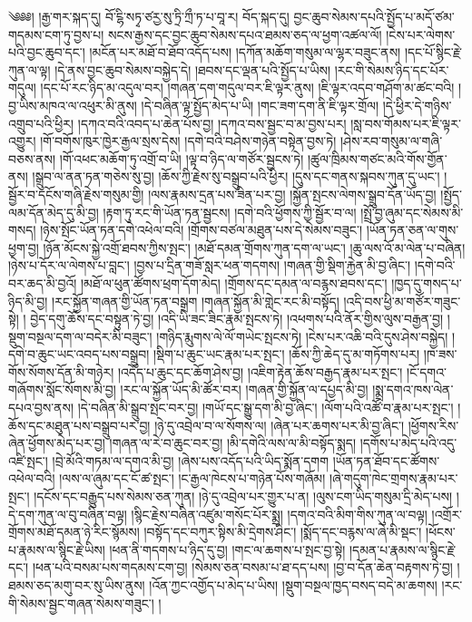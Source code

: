༄༅༅། །རྒྱ་གར་སྐད་དུ། བོ་ངྷི་སཏྭ་ཙརྱ་སུ་ཏྲི་ཀྲྀ་ཏ་པ་བཱ་ར། བོད་སྐད་དུ། བྱང་ཆུབ་སེམས་དཔའི་སྤྱོད་པ་མདོ་ཙམ་གདམས་ངག་ཏུ་བྱས་པ། སངས་རྒྱས་དང་བྱང་ཆུབ་སེམས་དཔའ་ཐམས་ཅད་ལ་ཕྱག་འཚལ་ལོ། །ངེས་པར་ལེགས་པའི་བྱང་ཆུབ་དང་། །མངོན་པར་མཐོ་བ་ཐོབ་འདོད་པས། །དཀོན་མཆོག་གསུམ་ལ་ལྷར་བཟུང་ནས། །དང་པོ་སྙིང་རྗེ་ཀུན་ལ་ལྟ། །དེ་ནས་བྱང་ཆུབ་སེམས་བསྐྱེད་དེ། །ཐབས་དང་ལྡན་པའི་སྤྱོད་པ་ཡིས། །རང་གི་སེམས་ཉིད་དང་པོར་གདུལ། །དང་པོ་རང་ཉིད་མ་འདུལ་བར། །གཞན་དག་གདུལ་བར་ཇི་ལྟར་ནུས། །ཇི་ལྟར་འདབ་གཤོག་མ་ཚང་བའི། །བྱ་ཡིས་མཁའ་ལ་འཕུར་མི་ནུས། །དེ་བཞིན་ལྟ་སྤྱོད་མེད་པ་ཡི། །གང་ཟག་དག་ནི་ཇི་ལྟར་གྲོལ། །དེ་ཕྱིར་དེ་གཉིས་འགྲུབ་པའི་ཕྱིར། །དཀའ་བའི་འབད་པ་ཆེན་པོས་བྱ། །དཀའ་བས་སྦྱང་བ་མ་བྱས་པར། །སླ་བས་གོམས་པར་ཇི་ལྟར་འགྱུར། །གོ་བགོས་ཁུར་ཁྱེར་རྒྱལ་སྲས་དེས། །དགེ་བའི་བཤེས་གཉེན་བསྟེན་བྱས་ཏེ། །ཤེས་རབ་གསུམ་ལ་གཞི་བཅས་ནས། །གོ་འཕང་མཆོག་ཏུ་འགྲོ་བ་ཡི། །ལྟ་བ་ཉིད་ལ་གཙོར་སྦྱངས་ཏེ། །ཚུལ་ཁྲིམས་གཙང་མའི་གོས་གྱོན་ནས། །སྒྲུབ་ལ་ནན་ཏན་གཅེས་སུ་བྱ། །ཆོས་ཀྱི་རྗེས་སུ་བསྒྲུབ་པའི་ཕྱིར། །དུས་དང་གནས་སྐབས་ཀུན་དུ་ཡང་། །སྦྱོར་བ་དངོས་གཞི་རྗེས་གསུམ་གྱི། །ལས་རྣམས་དྲན་པས་ཟིན་པར་བྱ། །སྐྱོན་སྤངས་ལེགས་སྒྲུབ་དོན་ཡོད་བྱ། །སྤྱོད་ལམ་དོན་མེད་དུ་མི་བྱ། །རྟག་ཏུ་རང་གི་ཡོན་ཏན་སྦྱངས། །དགེ་བའི་ཕྱོགས་ཀྱི་སྦྱོར་བ་ལ། །སྤྲོ་བྱ་ཞུམ་དང་སེམས་མི་གསད། །ཉེས་སྤོང་ཡོན་ཏན་དགེ་འཕེལ་བའི། །གྲོགས་བཙལ་མཐུན་པས་དེ་སེམས་བཟུང་། །ཡོན་ཏན་ཅན་ལ་གུས་ཕྱག་བྱ། །ཉོན་མོངས་སྐྱེ་འགྲོ་ཐབས་ཀྱིས་སྤང་། །མཐོ་དམན་གྲོགས་ཀུན་དག་ལ་ཡང་། །ཆུ་ལས་འོ་མ་ལེན་པ་བཞིན། །ཉེས་པ་དོར་ལ་ལེགས་པ་བླང་། །བྱས་པ་དྲིན་གཟོ་སླར་ཕན་གདགས། །གཞན་གྱི་སྡིག་རྐྱེན་མི་བྱ་ཞིང་། །དགེ་བའི་བར་ཆད་མི་བྱའོ། །མཐོ་ལ་ཕུན་ཚོགས་ཕྲག་དོག་མེད། །གྲོགས་དང་དམན་ལ་བརྙས་ཐབས་དང་། །ཁྱད་དུ་གསད་པ་ཉིད་མི་བྱ། །རང་སྐྱོན་གཞན་གྱི་ཡོན་ཏན་བསྒྲག །གཞན་སྐྱོན་མི་གླེང་རང་མི་བསྟོད། །འདི་བས་ཕྱི་མ་གཙོར་གཟུང་སྟེ། །
བྱེད་དགུ་ཆོས་དང་བསྟུན་ཏེ་བྱ། །འདི་ཡི་ཟང་ཟིང་རྣམ་སྤངས་ཏེ། །འཕགས་པའི་ནོར་གྱིས་ལུས་བརྒྱན་བྱ། །སྡུག་བསྔལ་དག་ལ་བདེར་མི་བཟུང་། །གཉིད་རྨུགས་ལེ་ལོ་གཡེང་སྤངས་ཏེ། །ངེས་པར་འཆི་བའི་དུས་ཤེས་བསྐྱེད། །དགེ་བ་ཆུང་ཡང་འབད་པས་བསྒྲུབ། །སྡིག་པ་ཆུང་ཡང་རྣམ་པར་སྤང་། །ཆོས་ཀྱི་ཆེད་དུ་མ་གཏོགས་པར། །ཁ་ཟས་གོས་སོགས་དོན་མི་གཉེར། །འདོད་པ་ཆུང་དང་ཆོག་ཤེས་བྱ། །འཇིག་རྟེན་ཆོས་བརྒྱད་རྣམ་པར་སྤང་། །ངོ་དགའ་གཞོགས་སློང་སོགས་མི་བྱ། །རང་ལ་སྐྱོན་ཡོད་མི་ཚོར་བར། །གཞན་གྱི་སྐྱོན་ལ་དཔྱད་མི་བྱ། །སྨྲ་དགའ་ཁས་ལེན་དཔའ་བྱས་ནས། །དེ་བཞིན་མི་སྒྲུབ་སྤང་བར་བྱ། །གཡོ་དང་སྒྱུ་དག་མི་བྱ་ཞིང་། །ལོག་པའི་འཚོ་བ་རྣམ་པར་སྤང་། །ཆོས་དང་མཐུན་པས་བསྒྲུབ་པར་བྱ། །ཉེ་དུ་འབྲེལ་བ་ལ་སོགས་ལ། །ཞེན་པར་ཆགས་པར་མི་བྱ་ཞིང་། །ཕྱོགས་རིས་ཞེན་ཕྱོགས་མེད་པར་བྱ། །གཞན་ལ་རེ་བ་ཆུང་བར་བྱ། །མི་དགེའི་ལས་ལ་མི་བསྟོད་སྨད། །དགོས་པ་མེད་པའི་འདུ་འཛི་སྤང་། །བྲེ་མོའི་གཏམ་ལ་དགའ་མི་བྱ། །ཞེས་པས་འདོད་པའི་ཡིད་སྨོན་དགག །ཡོན་ཏན་ཐོབ་དང་ཚོགས་འཕེལ་བའི། །ལས་ལ་ཞུམ་དང་ངོ་ཚ་སྤང་། །ང་རྒྱལ་ཁེངས་པ་གཉེན་པོས་གཞོམ། །ཞེ་གདུག་ཁེང་གྲགས་རྣམ་པར་སྤང་། །དངོས་དང་བརྒྱུད་པས་སེམས་ཅན་ཀུན། །ཉེ་དུ་འབྲེལ་པར་གྱུར་པ་ན། །ལུས་ངག་ཡིད་གསུམ་དྲི་མེད་པས། །དེ་དག་ཀུན་ལ་བུ་བཞིན་བལྟ། །སྙིང་རྗེས་བཞིན་འཛུམ་གསོང་པོར་སྨྲ། །དགའ་བའི་མིག་གིས་ཀུན་ལ་བལྟ། །འགྲོར་གྲོགས་མཐོ་དམན་ཉེ་རིང་སྙོམས། །བསྟོད་དང་བཀུར་སྟིས་མི་དྲེགས་ཤིང་། །སྨོད་དང་བརྙས་ལ་ཞེ་མི་སྡང་། །ཕོངས་པ་རྣམས་ལ་སྙིང་རྗེ་ཡིས། །ཕན་ནི་གདགས་པ་ཉིད་དུ་བྱ། །གང་ལ་ཆགས་པ་སྤང་བྱ་སྟེ། །དམན་པ་རྣམས་ལ་སྙིང་རྗེ་དང་། །ཕན་པའི་བསམ་པས་གདམས་ངག་བྱ། །སེམས་ཅན་བསམ་པ་ཐ་དད་པས། །བྱ་བ་དོན་ཆེན་བརྟགས་ཏེ་བྱ། །ཐམས་ཅད་མགུ་བར་སུ་ཡིས་ནུས། །འོན་ཀྱང་འགྱོད་པ་མེད་པ་ཡིས། །སྡུག་བསྔལ་ཁྱད་བསད་བདེ་མ་ཆགས། །རང་གི་སེམས་སྦྱང་གཞན་སེམས་གཟུང་། །
